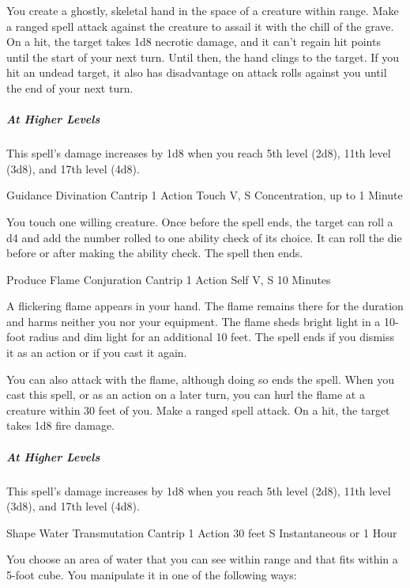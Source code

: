 {You create a ghostly, skeletal hand in the space of a creature within range. Make a ranged spell attack against the creature to assail it with the chill of the grave. On a hit, the target takes 1d8 necrotic damage, and it can’t regain hit points until the start of your next turn. Until then, the hand clings to the target. If you hit an undead target, it also has disadvantage on attack rolls against you until the end of your next turn.

\subparagraph*{At Higher Levels} This spell's damage increases by 1d8 when you reach 5th level (2d8), 11th level (3d8), and 17th level (4d8).

\DndSpellHeader
  {Guidance}
  {Divination Cantrip}
  {1 Action}
  {Touch}
  {V, S}
  {Concentration, up to 1 Minute}

You touch one willing creature. Once before the spell ends, the target can roll a d4 and add the number rolled to one ability check of its choice. It can roll the die before or after making the ability check. The spell then ends.

\DndSpellHeader
  {Produce Flame}
  {Conjuration Cantrip}
  {1 Action}
  {Self}
  {V, S}
  {10 Minutes}

A flickering flame appears in your hand. The flame remains there for the duration and harms neither you nor your equipment. The flame sheds bright light in a 10-foot radius and dim light for an additional 10 feet. The spell ends if you dismiss it as an action or if you cast it again.

You can also attack with the flame, although doing so ends the spell. When you cast this spell, or as an action on a later turn, you can hurl the flame at a creature within 30 feet of you. Make a ranged spell attack. On a hit, the target takes 1d8 fire damage.

\subparagraph*{At Higher Levels} This spell's damage increases by 1d8 when you reach 5th level (2d8), 11th level (3d8), and 17th level (4d8).

\DndSpellHeader
  {Shape Water}
  {Transmutation Cantrip}
  {1 Action}
  {30 feet}
  {S}
  {Instantaneous or 1 Hour}

You choose an area of water that you can see within range and that fits within a 5-foot cube. You manipulate it in one of the following ways:

}
